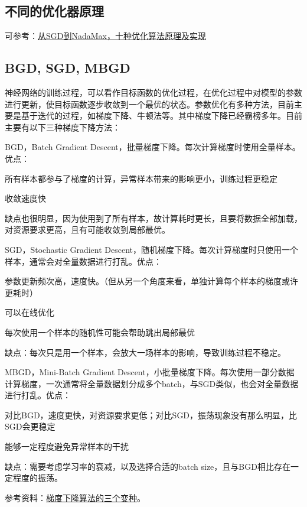 \subsection{不同的优化器原理}
可参考：\href{https://mp.weixin.qq.com/s/L9jCK5rtyq3fJZEBpLvagg}{从SGD到NadaMax，十种优化算法原理及实现}

\subsection{BGD, SGD, MBGD}
神经网络的训练过程，可以看作目标函数的优化过程，在优化过程中对模型的参数进行更新，使目标函数逐步收敛到一个最优的状态。参数优化有多种方法，目前主要是基于迭代的过程，如梯度下降、牛顿法等。其中梯度下降已经霸榜多年。目前主要有以下三种梯度下降方法：
\begin{myitemize}
	\item BGD，Batch  Gradient Descent，批量梯度下降。每次计算梯度时使用全量样本。优点：
	\begin{myitemize}
		\item 所有样本都参与了梯度的计算，异常样本带来的影响更小，训练过程更稳定
		\item 收敛速度快
	\end{myitemize}
	缺点也很明显，因为使用到了所有样本，故计算耗时更长，且要将数据全部加载，对资源要求更高，且有可能收敛到局部最优。
	
	\item SGD，Stochastic Gradient Descent，随机梯度下降。每次计算梯度时只使用一个样本，通常会对全量数据进行打乱。优点：
	\begin{myitemize}
		\item 参数更新频次高，速度快。（但从另一个角度来看，单独计算每个样本的梯度或许更耗时）
		\item 可以在线优化
		\item 每次使用一个样本的随机性可能会帮助跳出局部最优
	\end{myitemize}
	缺点：每次只是用一个样本，会放大一场样本的影响，导致训练过程不稳定。
	
	\item MBGD，Mini-Batch Gradient Descent，小批量梯度下降。每次使用一部分数据计算梯度，一次通常将全量数据划分成多个batch，与SGD类似，也会对全量数据进行打乱。优点：
	\begin{myitemize}
		\item 对比BGD，速度更快，对资源要求更低；对比SGD，振荡现象没有那么明显，比SGD会更稳定
		\item 能够一定程度避免异常样本的干扰
	\end{myitemize}
	缺点：需要考虑学习率的衰减，以及选择合适的batch size，且与BGD相比存在一定程度的振荡。
\end{myitemize}
参考资料：\href{https://lumingdong.cn/summary-of-gradient-descent-algorithm.html#%E6%A2%AF%E5%BA%A6%E4%B8%8B%E9%99%8D%E7%AE%97%E6%B3%95%E7%9A%84%E4%B8%89%E4%B8%AA%E5%8F%98%E7%A7%8D}{梯度下降算法的三个变种}。
	
